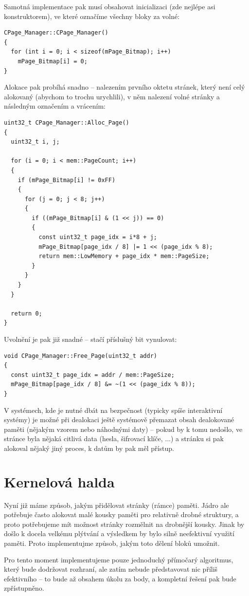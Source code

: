 \documentclass{article}
\begin{document}
Samotná implementace pak musí obsahovat inicializaci (zde nejlépe asi konstruktorem), ve které označíme všechny bloky za volné:
\begin{lstlisting}
CPage_Manager::CPage_Manager()
{
  for (int i = 0; i < sizeof(mPage_Bitmap); i++)
    mPage_Bitmap[i] = 0;
}
\end{lstlisting}
Alokace pak probíhá snadno -- nalezením prvního oktetu stránek, který není celý alokovaný (abychom to trochu urychlili), v něm nalezení volné stránky a následným označením a vrácením:
\begin{lstlisting}
uint32_t CPage_Manager::Alloc_Page()
{
  uint32_t i, j;
	
  for (i = 0; i < mem::PageCount; i++)
  {
    if (mPage_Bitmap[i] != 0xFF)
    {
      for (j = 0; j < 8; j++)
      {
        if ((mPage_Bitmap[i] & (1 << j)) == 0)
        {
          const uint32_t page_idx = i*8 + j;
          mPage_Bitmap[page_idx / 8] |= 1 << (page_idx % 8);
          return mem::LowMemory + page_idx * mem::PageSize;
        }
      }
    }
  }

  return 0;
}
\end{lstlisting}
Uvolnění je pak již snadné -- stačí příslušný bit vynulovat:
\begin{lstlisting}
void CPage_Manager::Free_Page(uint32_t addr)
{
  const uint32_t page_idx = addr / mem::PageSize;
  mPage_Bitmap[page_idx / 8] &= ~(1 << (page_idx % 8));
}
\end{lstlisting}
V systémech, kde je nutné dbát na bezpečnost (typicky spíše interaktivní systémy) je možné při dealokaci ještě systémově přemazat obsah dealokované paměti (nějakým vzorem nebo náhodnými daty) -- pokud by k tomu nedošlo, ve stránce byla nějaká citlivá data (hesla, šifrovací klíče, ...) a stránku si pak alokoval nějaký jiný proces, k datům by pak měl přístup.

\section{Kernelová halda}

Nyní již máme způsob, jakým přidělovat stránky (rámce) paměti. Jádro ale potřebuje často alokovat malé kousky paměti pro relativně drobné struktury, a proto potřebujeme mít možnost stránky rozmělnit na drobnější kousky. Jinak by došlo k docela velkému plýtvání a výsledkem by bylo silně neefektivní využití paměti. Proto implementujme způsob, jakým toto dělení bloků umožnit.

Pro tento moment implementujeme pouze jednoduchý přímočarý algoritmus, který bude dodržovat rozhraní, ale zatím nebude představovat nic příliš efektivního -- to bude až obsahem úkolu za body, a kompletní řešení pak bude zpřístupněno.
\end{document}

